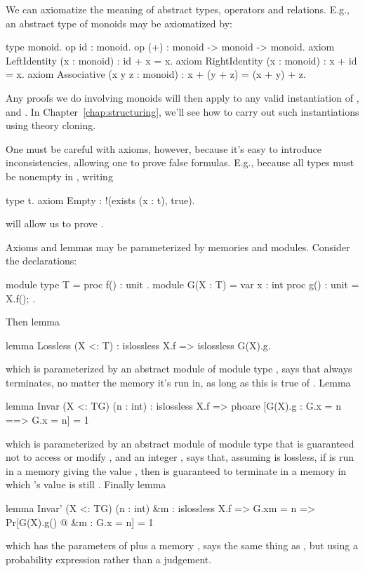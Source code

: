 We can axiomatize the meaning of abstract types, operators and relations.
E.g., an abstract type of monoids may be axiomatized by:
\begin{easycrypt}{}{}
type monoid.
op id : monoid.
op (+) : monoid -> monoid -> monoid.
axiom LeftIdentity (x : monoid) : id + x = x.
axiom RightIdentity (x : monoid) : x + id = x.
axiom Associative (x y z : monoid) : x + (y + z) = (x + y) + z.
\end{easycrypt}
Any proofs we do involving monoids will then apply to any valid
instantiation of ,  and \ec{(+)}. In
Chapter~\ref{chap:structuring}, we'll see how to carry out such instantiations
using theory cloning.

One must be careful with axioms, however, because it's easy to introduce
inconsistencies, allowing one to prove false formulas. E.g., because
all types must be nonempty in \EasyCrypt, writing
\begin{easycrypt}{}{}
type t.
axiom Empty : !(exists (x : t), true).
\end{easycrypt}
will allow us to prove .

Axioms and lemmas may be parameterized by
memories and modules. Consider the declarations:
\begin{easycrypt}{}{}
module type T = {
  proc f() : unit
}.
module G(X : T) = {
  var x : int
  proc g() : unit = {
    X.f();
  }
}.
\end{easycrypt}
Then lemma 
\begin{easycrypt}{}{}
lemma Lossless (X <: T) : islossless X.f => islossless G(X).g.
\end{easycrypt}
which is parameterized by an abstract module  of module type
, says that  always terminates, no matter the memory
it's run in, as long as this is true of .
Lemma 
\begin{easycrypt}{}{}
lemma Invar (X <: T{G}) (n : int) :
  islossless X.f =>
  phoare [G(X).g : G.x = n ==> G.x = n] = 1%
\end{easycrypt}
which is parameterized by an abstract module  of module type
 that is guaranteed not to access or modify , and an
integer , says that, assuming  is lossless, if
 is run in a memory giving  the value ,
then  is guaranteed to terminate in a memory in which
's value is still .  Finally lemma 
\begin{easycrypt}{}{}
lemma Invar' (X <: T{G}) (n : int) &m :
  islossless X.f => G.x{m} = n =>
  Pr[G(X).g() @ &m : G.x = n] = 1%
\end{easycrypt}
which has the parameters of  plus a memory ,
says the same thing as , but using a probability
expression rather than a \phl judgement.
